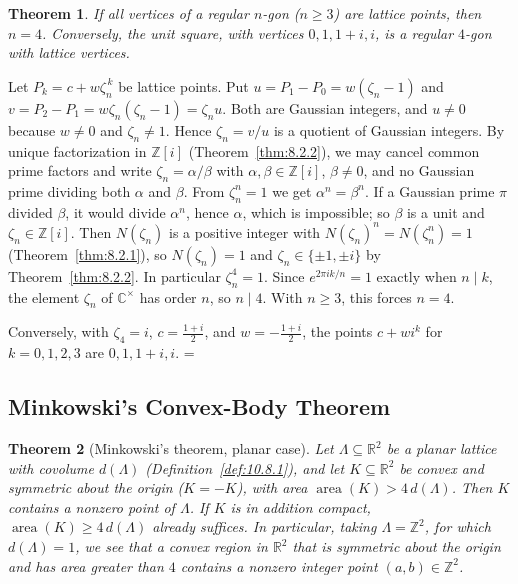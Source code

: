 \documentclass[11pt]{article}
\makeatletter
\let\nt@closedisplay\]
\def\nt@guardedclose{\@ifnextchar\par{\nt@closeafterpar}{\@ifnextchar\end{\postdisplaypenalty\@M\nt@closedisplay}{\nt@closedisplay}}}
\def\nt@closeafterpar\par{\@ifnextchar\par{\nt@closeafterpar}{\@ifnextchar\end{\postdisplaypenalty\@M\nt@closedisplay\par}{\nt@closedisplay\par}}}
\renewenvironment{proof}[1][\proofname]{\par
  \pushQED{\qed}\normalfont\topsep\medskipamount\edef\nt@afterproof{\@endparpenalty=\the\@endparpenalty\relax}\@beginparpenalty\@M\@endparpenalty\@M\let\]\nt@guardedclose\trivlist\item[]\textit{#1\@addpunct{.}} \ignorespaces}{\ifvmode\addpenalty\@M\fi\popQED\nt@afterproof\endtrivlist\@endpefalse}
\theoremstyle{ntstyle}
\newtheorem{theorem}{Theorem}[subsection]
\DeclareMathOperator{\area}{area}
\makeatother
\begin{document}
\begin{theorem}\label{thm:10.10.1} If all vertices of a regular $n$-gon
  ($n\ge3$) are lattice points, then $n=4$. Conversely, the unit square, with
  vertices $0,1,1+i,i$, is a regular $4$-gon with lattice vertices.

\end{theorem}

\begin{proof} Let $P_k=c+w\zeta_n^{\,k}$ be lattice points. Put
  $u=P_1-P_0=w(\zeta_n-1)$ and $v=P_2-P_1=w\zeta_n(\zeta_n-1)=\zeta_n u$. Both
  are Gaussian integers, and $u\neq0$ because $w\neq0$ and $\zeta_n\neq1$.
  Hence $\zeta_n=v/u$ is a quotient of Gaussian integers. By unique
  factorization in $\mathbb{Z}[i]$ (Theorem~\ref{thm:8.2.2}), we may cancel
  common prime factors and write $\zeta_n=\alpha/\beta$ with
  $\alpha,\beta\in\mathbb{Z}[i]$, $\beta\neq0$, and no Gaussian prime dividing
  both $\alpha$ and $\beta$. From $\zeta_n^n=1$ we get $\alpha^n=\beta^n$. If a
  Gaussian prime $\pi$ divided $\beta$, it would divide $\alpha^n$, hence
  $\alpha$, which is impossible; so $\beta$ is a unit and
  $\zeta_n\in\mathbb{Z}[i]$. Then $N(\zeta_n)$ is a positive integer with
  $N(\zeta_n)^n=N(\zeta_n^n)=1$ (Theorem~\ref{thm:8.2.1}), so $N(\zeta_n)=1$
  and $\zeta_n\in\{\pm1,\pm i\}$ by Theorem~\ref{thm:8.2.2}. In particular
  $\zeta_n^4=1$. Since $e^{2\pi ik/n}=1$ exactly when $n\mid k$, the element
  $\zeta_n$ of $\mathbb{C}^{\times}$ has order $n$, so $n\mid4$. With $n\ge3$,
  this forces $n=4$.

  Conversely, with $\zeta_4=i$, $c=\tfrac{1+i}{2}$, and $w=-\tfrac{1+i}{2}$, the
  points $c+wi^k$ for $k=0,1,2,3$ are $0,1,1+i,i$.
\end{proof}
\subsection{Minkowski's Convex-Body Theorem}

\begin{theorem}[Minkowski's theorem, planar case]\label{thm:10.11.1}\label{thm:minkowski-theorem-planar-case}
  Let
  $\Lambda\subseteq\mathbb{R}^2$ be a planar lattice with covolume
  $d(\Lambda)$ (Definition~\ref{def:10.8.1}), and let $K\subseteq\mathbb{R}^2$
  be convex and symmetric about the origin ($K=-K$), with area
  $\area(K)>4\,d(\Lambda)$. Then $K$ contains a nonzero
  point of $\Lambda$. If $K$ is in addition compact,
  $\area(K)\ge 4\,d(\Lambda)$ already suffices. In particular, taking
  $\Lambda=\mathbb{Z}^2$, for which $d(\Lambda)=1$, we see that a convex region in
  $\mathbb{R}^2$ that is symmetric about the origin and has area greater than $4$
  contains a nonzero integer point $(a,b)\in\mathbb{Z}^2$.

\end{theorem}
\end{document}
